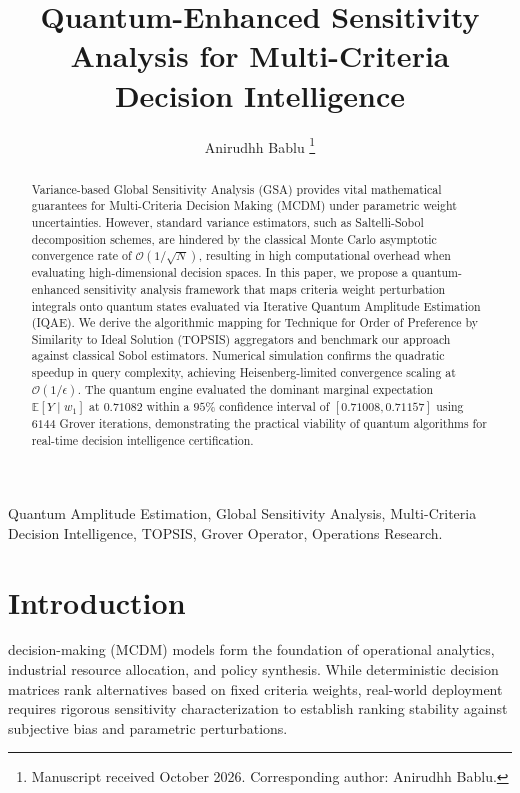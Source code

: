 \documentclass[journal]{IEEEtran}
\begin{document}
\title{Quantum-Enhanced Sensitivity Analysis for Multi-Criteria Decision Intelligence}

\author{Anirudhh Bablu
\thanks{Manuscript received October 2026. Corresponding author: Anirudhh Bablu.}}

\maketitle

\begin{abstract}
Variance-based Global Sensitivity Analysis (GSA) provides vital mathematical guarantees for Multi-Criteria Decision Making (MCDM) under parametric weight uncertainties. However, standard variance estimators, such as Saltelli-Sobol decomposition schemes, are hindered by the classical Monte Carlo asymptotic convergence rate of $\mathcal{O}(1/\sqrt{N})$, resulting in high computational overhead when evaluating high-dimensional decision spaces. In this paper, we propose a quantum-enhanced sensitivity analysis framework that maps criteria weight perturbation integrals onto quantum states evaluated via Iterative Quantum Amplitude Estimation (IQAE). We derive the algorithmic mapping for Technique for Order of Preference by Similarity to Ideal Solution (TOPSIS) aggregators and benchmark our approach against classical Sobol estimators. Numerical simulation confirms the quadratic speedup in query complexity, achieving Heisenberg-limited convergence scaling at $\mathcal{O}(1/\epsilon)$. The quantum engine evaluated the dominant marginal expectation $\mathbb{E}[Y \mid w_1]$ at $0.71082$ within a $95\%$ confidence interval of $[0.71008, 0.71157]$ using $6144$ Grover iterations, demonstrating the practical viability of quantum algorithms for real-time decision intelligence certification.
\end{abstract}

\begin{IEEEkeywords}
Quantum Amplitude Estimation, Global Sensitivity Analysis, Multi-Criteria Decision Intelligence, TOPSIS, Grover Operator, Operations Research.
\end{IEEEkeywords}

\section{Introduction}
 decision-making (MCDM) models form the foundation of operational analytics, industrial resource allocation, and policy synthesis. While deterministic decision matrices rank alternatives based on fixed criteria weights, real-world deployment requires rigorous sensitivity characterization to establish ranking stability against subjective bias and parametric perturbations.
\end{document}
